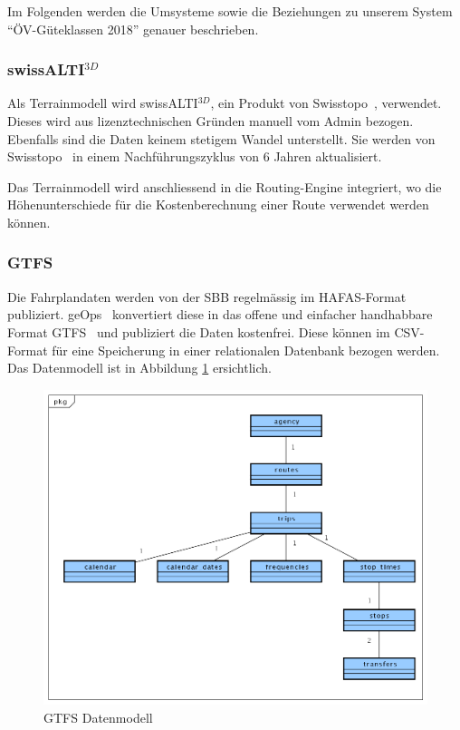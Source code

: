 Im Folgenden werden die Umsysteme sowie die Beziehungen zu unserem System "`ÖV-Güteklassen 2018"' genauer beschrieben.

\subsubsection{swissALTI$^{3D}$}
\label{subsystem:swissALTI3D}

Als \gls{Terrainmodell} wird swissALTI$^{3D}$, ein Produkt von Swisstopo~\cite{swissalti3d_swisstopo}, verwendet.
Dieses wird aus lizenztechnischen Gründen manuell vom Admin bezogen.
Ebenfalls sind die Daten keinem stetigem Wandel unterstellt.
Sie werden von Swisstopo~\cite{swissalti3d_swisstopo} in einem Nachführungszyklus von 6 Jahren aktualisiert.

Das \gls{Terrainmodell} wird anschliessend in die Routing-Engine integriert, wo die Höhenunterschiede für die Kostenberechnung einer Route verwendet werden können.

\subsubsection{GTFS}
\label{subsystem:GTFS}

Die Fahrplandaten werden von der SBB regelmässig im HAFAS-Format~\cite{sbb_hafas_spec} publiziert.
geOps~\cite{geops_fahrplandaten} konvertiert diese in das offene und einfacher handhabbare Format \ac{GTFS}~\cite{gtfs_spec} und publiziert die Daten kostenfrei.
Diese können im CSV-Format für eine Speicherung in einer relationalen Datenbank bezogen werden.
Das Datenmodell ist in Abbildung \ref{fig:GTFS_data_model} ersichtlich.

\begin{figure}[ht]
    \centering
    \includegraphics[width=1.0\linewidth]{projectdoc/img/GTFS_data_model}
    \caption[GTFS Datenmodell]{GTFS Datenmodell}
    \label{fig:GTFS_data_model}
\end{figure}

